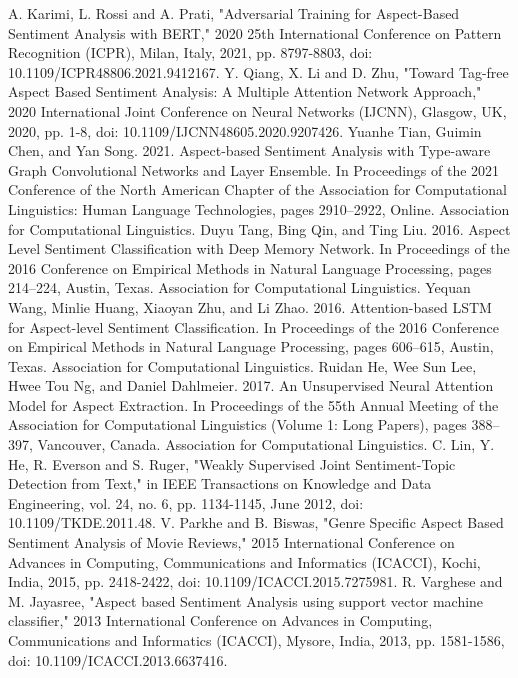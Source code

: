 \documentclass[conference]{IEEEtran}
\begin{document}
\begin{thebibliography}{00}
 A. Karimi, L. Rossi and A. Prati, "Adversarial Training for Aspect-Based Sentiment Analysis with BERT," 2020 25th International Conference on Pattern Recognition (ICPR), Milan, Italy, 2021, pp. 8797-8803, doi: 10.1109/ICPR48806.2021.9412167.
 Y. Qiang, X. Li and D. Zhu, "Toward Tag-free Aspect Based Sentiment Analysis: A Multiple Attention Network Approach," 2020 International Joint Conference on Neural Networks (IJCNN), Glasgow, UK, 2020, pp. 1-8, doi: 10.1109/IJCNN48605.2020.9207426.
 Yuanhe Tian, Guimin Chen, and Yan Song. 2021. Aspect-based Sentiment Analysis with Type-aware Graph Convolutional Networks and Layer Ensemble. In Proceedings of the 2021 Conference of the North American Chapter of the Association for Computational Linguistics: Human Language Technologies, pages 2910–2922, Online. Association for Computational Linguistics.
 Duyu Tang, Bing Qin, and Ting Liu. 2016. Aspect Level Sentiment Classification with Deep Memory Network. In Proceedings of the 2016 Conference on Empirical Methods in Natural Language Processing, pages 214–224, Austin, Texas. Association for Computational Linguistics.
 Yequan Wang, Minlie Huang, Xiaoyan Zhu, and Li Zhao. 2016. Attention-based LSTM for Aspect-level Sentiment Classification. In Proceedings of the 2016 Conference on Empirical Methods in Natural Language Processing, pages 606–615, Austin, Texas. Association for Computational Linguistics.
 Ruidan He, Wee Sun Lee, Hwee Tou Ng, and Daniel Dahlmeier. 2017. An Unsupervised Neural Attention Model for Aspect Extraction. In Proceedings of the 55th Annual Meeting of the Association for Computational Linguistics (Volume 1: Long Papers), pages 388–397, Vancouver, Canada. Association for Computational Linguistics.
 C. Lin, Y. He, R. Everson and S. Ruger, "Weakly Supervised Joint Sentiment-Topic Detection from Text," in IEEE Transactions on Knowledge and Data Engineering, vol. 24, no. 6, pp. 1134-1145, June 2012, doi: 10.1109/TKDE.2011.48.
 V. Parkhe and B. Biswas, "Genre Specific Aspect Based Sentiment Analysis of Movie Reviews," 2015 International Conference on Advances in Computing, Communications and Informatics (ICACCI), Kochi, India, 2015, pp. 2418-2422, doi: 10.1109/ICACCI.2015.7275981.
 R. Varghese and M. Jayasree, "Aspect based Sentiment Analysis using support vector machine classifier," 2013 International Conference on Advances in Computing, Communications and Informatics (ICACCI), Mysore, India, 2013, pp. 1581-1586, doi: 10.1109/ICACCI.2013.6637416.

\end{thebibliography}
\end{document}
